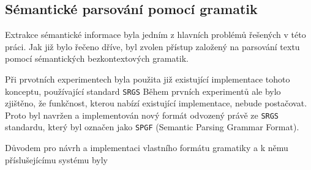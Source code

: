 \subsection{Sémantické parsování pomocí gramatik}\label{subsec:moje_gramatiky}
Extrakce sémantické informace byla jedním z hlavních problémů řešených v této práci.
Jak již bylo řečeno dříve, byl zvolen přístup založený na parsování textu pomocí sémantických bezkontextových gramatik.

Při prvotních experimentech byla použita již existující implementace tohoto konceptu,
používající standard \texttt{SRGS}
Během prvních experimentů ale bylo zjištěno, že funkčnost, kterou nabízí existující implementace, nebude postačovat.
Proto byl navržen a implementován nový formát odvozený právě ze \texttt{SRGS} standardu, který byl označen jako \texttt{SPGF} (Semantic Parsing Grammar Format).

Důvodem pro návrh a implementaci vlastního formátu gramatiky a k němu příslušejícímu systému byly
